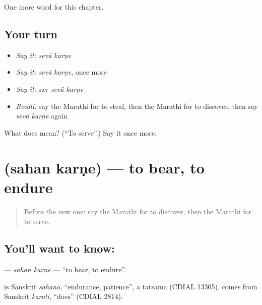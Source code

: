 \begin{grammarlens}[title={What you've built}]
One more word for this chapter.
\end{grammarlens}

\subsection*{Your turn}
\begin{itemize}
\raggedright
  \item \emph{Say it:} \emph{sevā karṇe}
  \item \emph{Say it:} \emph{sevā karṇe}, once more
  \item \emph{Say it:} say \emph{sevā karṇe}
  \item \emph{Recall:} say the Marathi for to steal, then the Marathi for to discover, then say \emph{sevā karṇe} again
\end{itemize}

\begin{tcolorbox}[breakable,colback=teal!4,colframe=teal!35!black,title={Before you move on}]
What does   mean? (\textquotedblleft{}To serve\textquotedblright{}.) Say it once more.
\end{tcolorbox}
\section[\texorpdfstring{\mr{सहन} \mr{करणे} (sahan karṇe)}{सहन करणे (sahan karṇe)}]{  (sahan karṇe) — to bear, to endure}

\label{lesson:MR-C254-sahan-karne}



\begin{quote}
Before the new one: say the Marathi for to discover, then the Marathi for to serve.
\end{quote}

\subsection*{You'll want to know:  }
\textbf{ } — \emph{sahan karṇe} — \textquotedblleft{}to bear, to endure\textquotedblright{}.

\begin{cousinweb}
\textbf{} is Sanskrit \emph{sahana}, \textquotedblleft{}endurance, patience\textquotedblright{}, a tatsama (CDIAL 13305). \textbf{} comes from Sanskrit \emph{karoti}, \textquotedblleft{}does\textquotedblright{} (CDIAL 2814).
\end{cousinweb}


